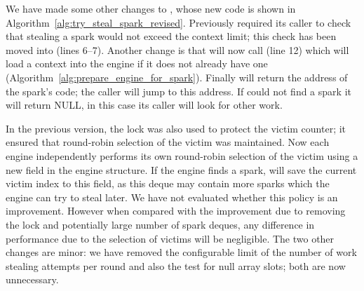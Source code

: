 We have made some other changes to \trystealspark,
whose new code is shown in Algorithm~\ref{alg:try_steal_spark_revised}.
Previously \trystealspark required its caller to check that stealing a spark
would not exceed the context limit;
this check has been moved into \trystealspark (lines 6--7).
Another change is that \trystealspark
will now call \prepareengineforspark (line 12)
which will load a context into the engine if it does not already have one
(Algorithm~\ref{alg:prepare_engine_for_spark}).
Finally \trystealspark will return the address of the spark's code;
the caller will jump to this address.
If \trystealspark could not find a spark it will return NULL,
in this case its caller will look for other work.

In the previous version,
the lock was also used to protect the victim counter;
it ensured that round-robin selection of the victim was maintained.
Now each engine independently performs its own round-robin selection of the
victim using a new field  in the engine structure.
If the engine finds a spark,
\trystealspark will save the current victim index to this field,
as this deque may contain more sparks which the engine can try to
steal later.
We have not evaluated whether this policy is an improvement.
However when compared with the improvement due to removing the lock and
potentially large number of spark deques,
any difference in performance due to the selection of victims will be
negligible.
The two other changes are minor:
we have removed the configurable limit of the number of work stealing
attempts per round and also
the test for null array slots;
both are now unnecessary.


